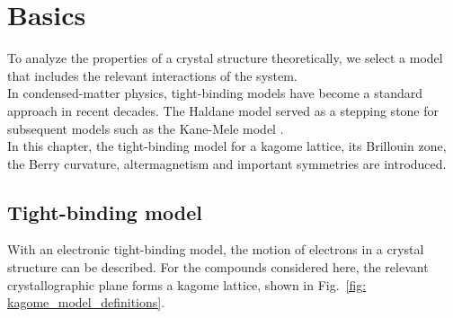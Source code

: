 

\chapter{Basics}
\label{chapter:Theory}

To analyze the properties of a crystal structure theoretically, we select a model that includes the relevant interactions of the system. \\
In condensed-matter physics, tight-binding models have become a standard approach in recent decades. The Haldane model \cite{Haldane_1988} served as a stepping stone for subsequent models such as the Kane-Mele model \cite{Kane_2005}. \\
In this chapter, the tight-binding model for a kagome lattice, its Brillouin zone, the Berry curvature, altermagnetism and important symmetries are introduced. 

\section{Tight-binding model}
\label{section: tightbinding}
With an electronic tight-binding model, the motion of electrons in a crystal structure can be described. For the compounds considered here, the relevant crystallographic plane forms a kagome lattice, shown in Fig.~\ref{fig: kagome_model_definitions}.

